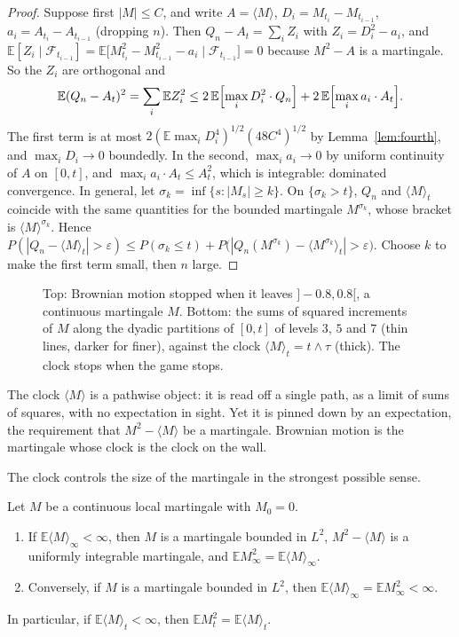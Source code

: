 \begin{proof}
Suppose first $|M|\le C$, and write $A=\langle M\rangle$, $D_i=M_{t_i}-M_{t_{i-1}}$, $a_i=A_{t_i}-A_{t_{i-1}}$ (dropping $n$). Then $Q_n-A_t=\sum_iZ_i$ with $Z_i=D_i^2-a_i$, and
$\mathbb E[Z_i\mid\mathcal F_{t_{i-1}}]=\mathbb E\bigl[M_{t_i}^2-M_{t_{i-1}}^2-a_i\mid \mathcal F_{t_{i-1}}\bigr]=0$ because $M^2-A$ is a martingale. So the $Z_i$ are orthogonal and
\[
\mathbb E(Q_n-A_t)^2=\sum_i\mathbb EZ_i^2\le2\,\mathbb E\Bigl[\max_iD_i^2\cdot Q_n\Bigr]+2\,\mathbb E\Bigl[\max_ia_i\cdot A_t\Bigr].
\]
The first term is at most $2(\mathbb E\max_iD_i^4)^{1/2}(48C^4)^{1/2}$ by Lemma~\ref{lem:fourth}, and $\max_iD_i\to0$ boundedly. In the second, $\max_ia_i\to0$ by uniform continuity of $A$ on $[0,t]$, and $\max_ia_i\cdot A_t\le A_t^2$,
which is integrable: dominated convergence. In general, let $\sigma_k=\inf\{s:|M_s|\ge k\}$. On $\{\sigma_k>t\}$, $Q_n$ and $\langle M\rangle_t$ coincide with the same quantities for the bounded martingale $M^{\sigma_k}$, whose
bracket is $\langle M\rangle^{\sigma_k}$. Hence
$P(|Q_n-\langle M\rangle_t|>\varepsilon)\le P(\sigma_k\le t)+P\bigl(|Q_n(M^{\sigma_k})-\langle M^{\sigma_k}\rangle_t|>\varepsilon\bigr)$. Choose $k$ to make the first term small, then $n$ large.
\end{proof}

\begin{figure}[ht]
\centering
{}
\caption{Top: Brownian motion stopped when it leaves $]-0.8,0.8[$, a continuous martingale $M$. Bottom: the sums of squared increments of $M$ along the dyadic partitions of $[0,t]$ of levels $3$, $5$ and
$7$ (thin lines, darker for finer), against the clock $\langle M\rangle_t=t\wedge\tau$ (thick). The clock stops when the game stops.}
\label{fig:qv}
\end{figure}

\begin{beauty}
The clock $\langle M\rangle$ is a pathwise object: it is read off a single path, as a limit of sums of squares, with no expectation in sight. Yet it is pinned down by an expectation, the requirement that
$M^2-\langle M\rangle$ be a martingale. Brownian motion is the martingale whose clock is the clock on the wall.
\end{beauty}

The clock controls the size of the martingale in the strongest possible sense.

\begin{corollary}\label{cor:L2bracket}
Let $M$ be a continuous local martingale with $M_0=0$.
\begin{enumerate}[label=(\alph*)]
\item If $\mathbb E\langle M\rangle_\infty<\infty$, then $M$ is a martingale bounded in $L^2$, $M^2-\langle M\rangle$ is a uniformly integrable martingale, and $\mathbb EM_\infty^2=\mathbb E\langle M\rangle_\infty$.
\item Conversely, if $M$ is a martingale bounded in $L^2$, then $\mathbb E\langle M\rangle_\infty=\mathbb EM_\infty^2<\infty$.
\end{enumerate}
In particular, if $\mathbb E\langle M\rangle_t<\infty$, then $\mathbb EM_t^2=\mathbb E\langle M\rangle_t$.
\end{corollary}


